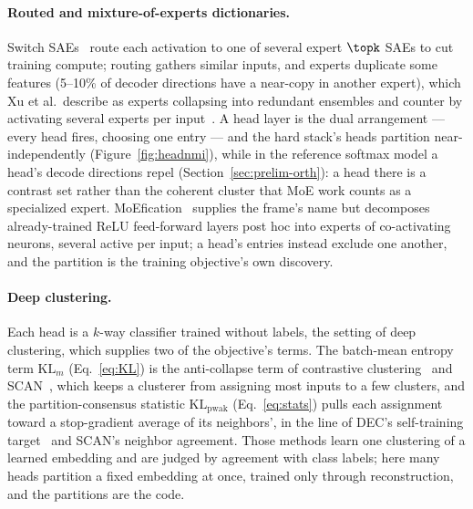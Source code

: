 \paragraph{Routed and mixture-of-experts dictionaries.}
Switch SAEs~\cite{mudide2025} route each activation to one of several
expert $\topk$ SAEs to cut training compute;
routing gathers similar inputs, and experts duplicate some features
(5--10\% of decoder directions have a near-copy in another expert), which
Xu et al.\ describe as experts collapsing into redundant ensembles and
counter by activating several experts per
input~\cite{xu2025redundancydiversespecializedmultiexpert}. A head layer is
the dual arrangement --- every head fires, choosing one entry --- and the
hard stack's heads partition near-independently
(Figure~\ref{fig:headnmi}), while in the reference softmax model a head's
decode directions repel (Section~\ref{sec:prelim-orth}): a head there is a
contrast set rather than the coherent cluster that MoE work counts as a
specialized expert. MoEfication~\cite{zhang2022} supplies the frame's name
but decomposes already-trained ReLU feed-forward layers post hoc into
experts of co-activating neurons, several active per input; a head's
entries instead exclude one another, and the partition is the training
objective's own discovery.

\paragraph{Deep clustering.}
Each head is a $k$-way classifier trained without labels, the setting of
deep clustering, which supplies two of the objective's terms. The
batch-mean entropy term $\mathrm{KL}_m$ (Eq.~\eqref{eq:KL}) is the
anti-collapse term of contrastive clustering~\cite{li2021cc} and
SCAN~\cite{vangansbeke2020scan}, which keeps a clusterer from assigning
most inputs to a few clusters, and the partition-consensus statistic
$\mathrm{KL}_{\mathrm{pwak}}$ (Eq.~\eqref{eq:stats}) pulls each
assignment toward a stop-gradient average of its neighbors', in the line
of DEC's self-training target~\cite{xie2016dec} and SCAN's neighbor
agreement. Those methods learn one clustering of a learned embedding and
are judged by agreement with class labels; here many heads partition a
fixed embedding at once, trained only through reconstruction, and the
partitions are the code.

